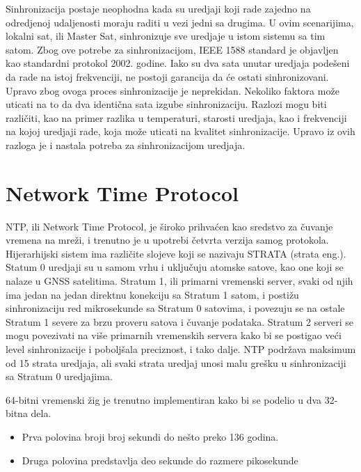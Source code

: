 \documentclass[a4paper,12pt, master]{etf}
\begin{document}
	Sinhronizacija postaje neophodna kada su uredjaji koji rade zajedno na odredjenoj 
	udaljenosti moraju raditi u vezi jedni sa drugima. U ovim scenarijima, lokalni sat, ili 
	Master Sat, sinhronizuje sve uredjaje u istom sistemu sa tim satom. Zbog ove potrebe za 
	sinhronizacijom, IEEE 1588 standard je objavljen kao standardni protokol 2002. godine.
	Iako su dva sata unutar uredjaja pode\v{s}eni da rade na istoj frekvenciji, ne postoji garancija 
	da \'{c}e ostati sinhronizovani. Upravo zbog ovoga proces sinhronizacije je neprekidan. Nekoliko 
	faktora mo\v{z}e uticati na to da dva identi\v{c}na sata izgube sinhronizaciju. Razlozi mogu biti 
	razli\v{c}iti, kao na primer razlika u temperaturi, starosti uredjaja, kao i frekvenciji na kojoj 
	uredjaji rade, koja mo\v{z}e uticati na kvalitet sinhronizacije. Upravo iz ovih razloga je i 
	nastala potreba za sinhronizacijom uredjaja.
	
	\section{Network Time Protocol}

	NTP, ili Network Time Protocol, je \v{s}iroko prihva\'{c}en kao sredstvo za \v{c}uvanje vremena na 
	mre\v{z}i, i trenutno je u upotrebi \v{c}etvrta verzija samog protokola. Hijerarhijski sistem ima 
	razli\v{c}ite slojeve koji se nazivaju STRATA (strata eng.). Statum 0 
	uredjaji su u samom vrhu i uklju\v{c}uju atomske satove, kao one koji se nalaze u GNSS 
	satelitima.	Stratum 1, ili primarni vremenski server, svaki od njih ima jedan na jedan 
	direktnu konekciju sa Stratum 1 satom, i posti\v{z}u sinhronizaciju red mikrosekunde sa Stratum 
	0 satovima, i povezuju se na ostale Stratum 1 severe za brzu proveru satova i \v{c}uvanje 
	podataka. Stratum 2 serveri se mogu povezivati na vi\v{s}e primarnih vremenskih servera kako 
	bi se postigao ve\'{c}i level sinhronizacije i pobolj\v{s}ala preciznost, i tako dalje. NTP 
	podr\v{z}ava maksimum od 15 strata uredjaja, ali svaki strata uredjaj unosi malu gre\v{s}ku u 
	sinhronizaciji sa Stratum 0 uredjajima.

	64-bitni vremenski \v{z}ig je trenutno implementiran kako bi se podelio u dva 32-bitna dela. 
	\begin{itemize}
		\item Prva polovina broji broj sekundi do ne\v{s}to preko 136 godina.
		\item Druga polovina predstavlja deo sekunde do razmere pikosekunde
	\end{itemize}
\end{document}
